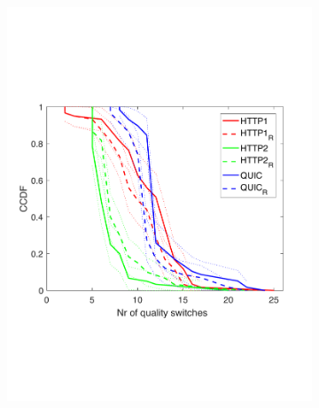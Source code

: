 \begin{figure}[t!]
\begin{subfigure}[t]{0.33\textwidth}
    \includegraphics[trim={0 6cm 0 7cm}, scale=0.25]{figures/CDF_cntswitch_squad_ec2Mumbai_nd18.pdf}
    \caption{}
    \label{fig:ec2Mumbaicntswitch}
  \end{subfigure}
  \begin{subfigure}[t]{0.33\textwidth}
  \captionsetup{justification=centering,margin=1.5cm}

\end{subfigure}
\end{figure}
